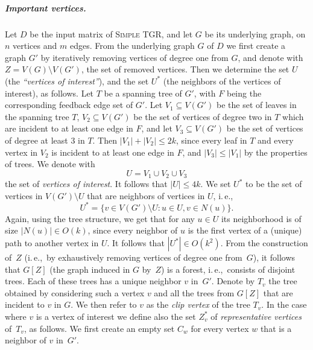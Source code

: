 \documentclass[a4paper,UKenglish,cleveref, autoref, thm-restate]{lipics-v2021}
\newcommand{\ie}{i.\,e.,\ }
\newcommand{\deltaExact}{\textsc{Simple TGR}}
\begin{document}
\subparagraph{Important vertices.}
Let $D$ be the input matrix of \deltaExact, and let $G$ be its underlying graph, on $n$ vertices and $m$ edges.
From the underlying graph $G$ of $D$ we first create a graph $G'$ by
iteratively removing vertices of degree one from $G$,
and denote with 
$
Z = V(G) \setminus V(G')
$, the set of removed vertices.
Then we determine the set $U$ (the \emph{``vertices of interest''}), and the set $U^*$ (the neighbors of the vertices of interest), as follows.
Let $T$ be a spanning tree of $G'$, with $F$ being the corresponding feedback edge set of $G'$.
Let $V_1 \subseteq V(G')$ be the set of leaves in the spanning tree $T$, $V_2 \subseteq V(G')$ be the set of vertices of degree two in $T$ which are incident to at least one edge in $F$, 
and let $V_3 \subseteq V(G')$ be the set of vertices of degree at least $3$ in $T$. 
Then $|V_1| + |V_2| \leq 2k$, since every leaf in $T$ and every vertex in $V_2$ is incident to at least one edge in $F$,
and $|V_3| \leq |V_1|$ by the properties of trees.
We denote with 
\[U = V_1 \cup V_2 \cup V_3\]
the set of \emph{vertices of interest}. It follows that $|U| \leq 4k$.
We set $U^*$ to be the set of vertices in $V(G') \setminus U$ that are neighbors of vertices in $U$, \ie 
\[U^* = \{v \in V(G') \setminus U  :  u \in U, v \in N(u)\}.\]
Again, using the tree structure, we get that for any $u \in U$ its neighborhood is of size $|N(u)| \in O(k)$, since every neighbor of $u$ is the first vertex of a (unique) path to another vertex in $U$.
It follows that $|U^*| \in O(k^2)$.
From the construction of~$Z$ (\ie by exhaustively removing vertices of degree one from~$G$), it follows that $G[Z]$ (the graph induced in $G$ by~$Z$) is a forest, \ie consists of disjoint trees. 
Each of these trees has a unique neighbor $v$ in~$G'$. 
Denote by $T_v$ the tree obtained by considering such a vertex $v$ and all the trees from $G[Z]$ that are incident to $v$ in $G$. 
We then refer to $v$ as the \emph{clip vertex} of the tree $T_v$.
In the case where $v$ is a vertex of interest we define also the set $Z^*_v$ of \emph{representative vertices} of~$T_v$, as follows.
%
We first create an empty set $C_w$ for every vertex $w$ that is a neighbor of $v$ in~$G'$.
\end{document}
